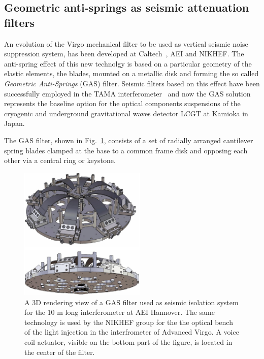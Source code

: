 %



\subsection{Geometric anti-springs as seismic attenuation filters}
\label{sec:Gas_spring}
\vskip 2mm
An evolution of the Virgo mechanical filter to be used as vertical seismic noise  
suppression system, has been developed at Caltech~\cite{cella}, AEI and NIKHEF.
The anti-spring effect of this new technolgy is based on a particular geometry of the
elastic elements, the blades, mounted on a metallic disk and forming the so called 
\emph{Geometric Anti-Springs} (GAS) filter.
Seismic filters based on this effect have been successfully employed in the TAMA 
interferometer~\cite{tamaexperience} and now the GAS solution represents the baseline 
option for the optical components suspensions of the cryogenic and underground gravitational 
waves detector LCGT at Kamioka in Japan.

The GAS filter, shown in Fig.~\ref{fig:gas1}, consists of a set of radially arranged cantilever 
spring blades clamped at the base to a common frame disk and opposing each other via a central 
ring or keystone. 
\begin{figure}[htbp!]
\centering
\includegraphics[width=6cm]{./Sec_Suspensions/Figures/gas1.pdf}
\caption{A 3D rendering view of a GAS filter used as seismic isolation system for the 10 m 
long interferometer at AEI Hannover. The same technology is used by the NIKHEF group for 
the the optical bench of the light injection in the interfrometer of Advanced Virgo. A voice coil actuator, visible on the bottom part of the figure, 
is located in the center of the filter.}
\label{fig:gas1}
\end{figure}

